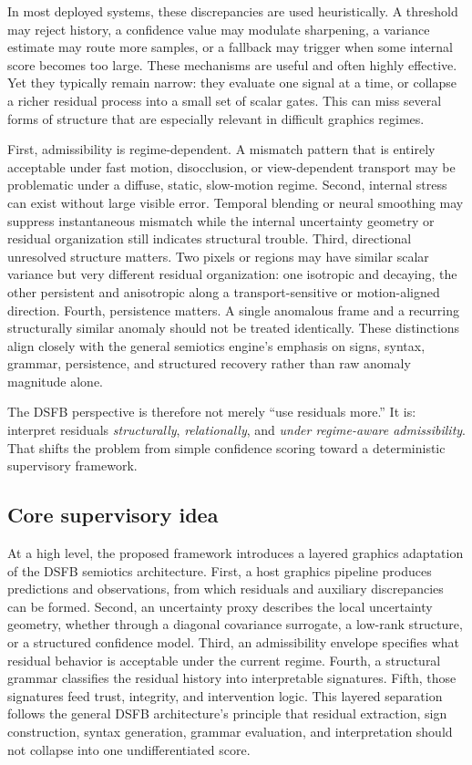 \documentclass[11pt,letterpaper]{article}
\theoremstyle{gcresult}
\theoremstyle{definition}
\begin{document}
In most deployed systems, these discrepancies are used heuristically. A threshold may reject history, a confidence value may modulate sharpening, a variance estimate may route more samples, or a fallback may trigger when some internal score becomes too large. These mechanisms are useful and often highly effective. Yet they typically remain narrow: they evaluate one signal at a time, or collapse a richer residual process into a small set of scalar gates. This can miss several forms of structure that are especially relevant in difficult graphics regimes.

First, admissibility is regime-dependent. A mismatch pattern that is entirely acceptable under fast motion, disocclusion, or view-dependent transport may be problematic under a diffuse, static, slow-motion regime. Second, internal stress can exist without large visible error. Temporal blending or neural smoothing may suppress instantaneous mismatch while the internal uncertainty geometry or residual organization still indicates structural trouble. Third, directional unresolved structure matters. Two pixels or regions may have similar scalar variance but very different residual organization: one isotropic and decaying, the other persistent and anisotropic along a transport-sensitive or motion-aligned direction. Fourth, persistence matters. A single anomalous frame and a recurring structurally similar anomaly should not be treated identically. These distinctions align closely with the general semiotics engine’s emphasis on signs, syntax, grammar, persistence, and structured recovery rather than raw anomaly magnitude alone. 

The DSFB perspective is therefore not merely “use residuals more.” It is: interpret residuals \emph{structurally}, \emph{relationally}, and \emph{under regime-aware admissibility}. That shifts the problem from simple confidence scoring toward a deterministic supervisory framework.


\subsection{Core supervisory idea}

At a high level, the proposed framework introduces a layered graphics adaptation of the DSFB semiotics architecture. First, a host graphics pipeline produces predictions and observations, from which residuals and auxiliary discrepancies can be formed. Second, an uncertainty proxy describes the local uncertainty geometry, whether through a diagonal covariance surrogate, a low-rank structure, or a structured confidence model. Third, an admissibility envelope specifies what residual behavior is acceptable under the current regime. Fourth, a structural grammar classifies the residual history into interpretable signatures. Fifth, those signatures feed trust, integrity, and intervention logic. This layered separation follows the general DSFB architecture’s principle that residual extraction, sign construction, syntax generation, grammar evaluation, and interpretation should not collapse into one undifferentiated score. 
\end{document}
